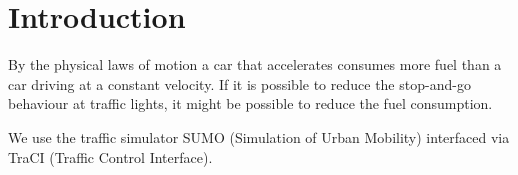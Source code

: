 \section{Introduction}
By the physical laws of motion a car that accelerates consumes more fuel than a car driving at a constant velocity. %
If it is possible to reduce the stop-and-go behaviour at traffic lights, it might be possible to reduce the fuel consumption.

We use the traffic simulator SUMO (Simulation of Urban Mobility)\cite{sumo} interfaced via TraCI (Traffic Control Interface)\cite{traci}.
